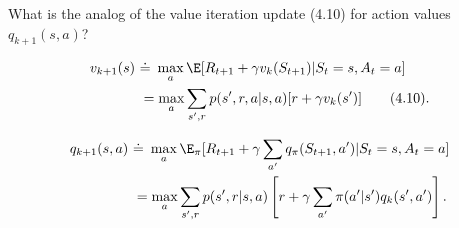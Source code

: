 
\begin{exercise}[Exercise 4.10]

What is the analog of the value iteration update (4.10) for action values $q_{k+1}(s,a)$?

\begin{align}
  v_{k+1}(s) \ &\dot= \ \max_a \E[R_{t+1} + \gamma v_k(S_{t+1}) | S_t = s, A_t = a] \notag \\
  &= \max_a \sum_{s',r} p(s',r,a|s,a)[r + \gamma v_k(s')] \tag{4.10}.
\end{align}

\end{exercise}


\begin{solution}

\begin{align*}
  q_{k+1}(s,a) \ &\dot= \ \max_{a} \E_\pi[R_{t+1} + \gamma \sum_{a'}q_\pi(S_{t+1},a') | S_t = s, A_t = a] \\
  &= \max_{a} \sum_{s',r} p(s',r|s,a)\left[r + \gamma \sum_{a'} \pi(a'|s')q_k(s',a')\right].
\end{align*}

\end{solution}

